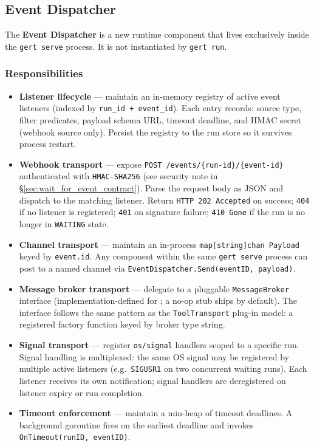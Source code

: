 \subsection{Event Dispatcher}
\label{sec:event_dispatcher}

The \textbf{Event Dispatcher} is a new runtime component that lives exclusively inside the
\texttt{gert serve} process. It is not instantiated by \texttt{gert run}.

\subsubsection*{Responsibilities}

\begin{itemize}
  \item \textbf{Listener lifecycle} — maintain an in-memory registry of active event listeners
        (indexed by \texttt{run\_id + event\_id}). Each entry records: source type, filter
        predicates, payload schema URL, timeout deadline, and HMAC secret (webhook source only).
        Persist the registry to the run store so it survives process restart.
  \item \textbf{Webhook transport} — expose \texttt{POST /events/\{run-id\}/\{event-id\}}
        authenticated with \texttt{HMAC-SHA256} (see security note in
        §\ref{sec:wait_for_event_contract}). Parse the request body as JSON and dispatch to
        the matching listener. Return \texttt{HTTP 202 Accepted} on success; \texttt{404} if
        no listener is registered; \texttt{401} on signature failure; \texttt{410 Gone} if
        the run is no longer in \texttt{WAITING} state.
  \item \textbf{Channel transport} — maintain an in-process \texttt{map[string]chan Payload}
        keyed by \texttt{event.id}. Any component within the same \texttt{gert serve} process
        can post to a named channel via \texttt{EventDispatcher.Send(eventID, payload)}.
  \item \textbf{Message broker transport} — delegate to a pluggable \texttt{MessageBroker}
        interface (implementation-defined for ; a no-op stub ships by default). The
        interface follows the same pattern as the \texttt{ToolTransport} plug-in model: a
        registered factory function keyed by broker type string.
  \item \textbf{Signal transport} — register \texttt{os/signal} handlers scoped to a specific
        run. Signal handling is multiplexed: the same OS signal may be registered by multiple
        active listeners (e.g.\ \texttt{SIGUSR1} on two concurrent waiting runs). Each
        listener receives its own notification; signal handlers are deregistered on listener
        expiry or run completion.
  \item \textbf{Timeout enforcement} — maintain a min-heap of timeout deadlines. A background
        goroutine fires on the earliest deadline and invokes \texttt{OnTimeout(runID, eventID)}.
\end{itemize}

